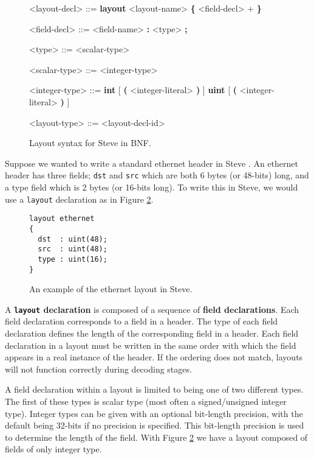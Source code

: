\begin{figure}[ht]
\begin{mdframed}
\begin{grammar}

<layout-decl> ::=
\textbf{layout} <layout-name> 
\textbf{\{}
	<field-decl> +
\textbf{\}}

<field-decl> ::=
<field-name> \textbf{:} <type> \textbf{;}

<type> ::=
<scalar-type>

<scalar-type> ::= <integer-type>

<integer-type> ::=
\textbf{int} [ \textbf{(} <integer-literal> \textbf{)} ]
\alt \textbf{uint} [ \textbf{(} <integer-literal> \textbf{)} ]

<layout-type> ::=
<layout-decl-id>

\end{grammar}
\end{mdframed}
\caption{Layout syntax for Steve in BNF.}
\label{fg:layout_syntax}
\end{figure}

Suppose we wanted to write a standard ethernet header in Steve \cite{eth_std}. An ethernet header has three fields; \texttt{dst} and \texttt{src} which are both 6 bytes (or 48-bits) long, and a type field which is 2 bytes (or 16-bits long). To write this in Steve, we would use a \texttt{layout} declaration as in Figure \ref{fg:eth_layout_ex}.

\begin{figure}[ht]
\begin{lstlisting}
layout ethernet
{
  dst  : uint(48);
  src  : uint(48);
  type : uint(16);
}
\end{lstlisting}
\caption{An example of the ethernet layout in Steve.}
\label{fg:eth_layout_ex}
\end{figure}

A \textbf{\texttt{layout} declaration} is composed of a sequence of \textbf{field declarations}. Each field declaration corresponds to a field in a header. The type of each field declaration defines the length of the corresponding field in a header. Each field declaration in a layout must be written in the same order with which the field appears in a real instance of the header. If the ordering does not match, layouts will not function correctly during decoding stages.   

A field declaration within a layout is limited to being one of two different types. The first of these types is scalar type (most often a signed/unsigned integer type). Integer types can be given with an optional bit-length precision, with the default being 32-bits if no precision is specified. This bit-length precision is used to determine the length of the field. With Figure \ref{fg:eth_layout_ex} we have a layout composed of fields of only integer type.

